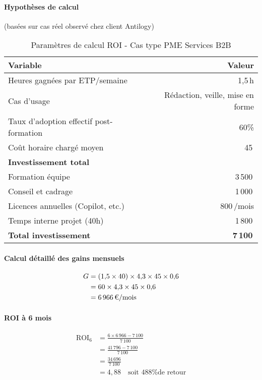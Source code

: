 \paragraph{Hypothèses de calcul} (basées sur cas réel observé chez client Antilogy)

\begin{table}[ht]
\centering
\caption{Paramètres de calcul ROI - Cas type PME Services B2B}
\label{tab:roi_parameters}
\begin{tabular}{@{}lr@{}}
\toprule
\textbf{Variable} & \textbf{Valeur} \\
\midrule
Heures gagnées par ETP/semaine & 1{,}5\,h \\
Cas d'usage & Rédaction, veille, mise en forme \\
Taux d'adoption effectif post-formation & 60\% \\
Coût horaire chargé moyen & 45\,\texteuro{} \\
\midrule
\textbf{Investissement total} & \\
Formation équipe & 3\,500\,\texteuro{} \\
Conseil et cadrage & 1\,000\,\texteuro{} \\
Licences annuelles (Copilot, etc.) & 800\,\texteuro{}/mois \\
Temps interne projet (40h) & 1\,800\,\texteuro{} \\
\textbf{Total investissement} & \textbf{7\,100\,\texteuro{}} \\
\bottomrule
\end{tabular}
\end{table}

\paragraph{Calcul détaillé des gains mensuels}
\begin{align}
G &= (1{,}5 \times 40) \times 4{,}3 \times 45 \times 0{,}6 \\
&= 60 \times 4{,}3 \times 45 \times 0{,}6 \\
&= 6\,966\,\text{\texteuro}/\text{mois}
\end{align}

\paragraph{ROI à 6 mois}
\begin{align}
\text{ROI}_6 &= \frac{6 \times 6\,966 - 7\,100}{7\,100} \\
&= \frac{41\,796 - 7\,100}{7\,100} \\
&= \frac{34\,696}{7\,100} \\
&= 4{,}88 \quad \text{soit 488\% de retour}
\end{align}

